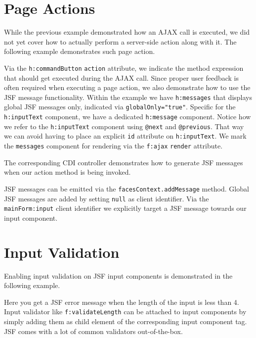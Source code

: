 \section{Page Actions}
While the previous example demonstrated how an AJAX call is executed, we did not yet cover how to actually perform a server-side action along with it.
The following example demonstrates such page action.

Via the \texttt{h:commandButton} \texttt{action} attribute, we indicate the method expression that should get executed during the AJAX call.
Since proper user feedback is often required when executing a page action, we also demonstrate how to use the JSF message functionality.
Within the example we have \texttt{h:messages} that displays global JSF messages only,
indicated via \texttt{globalOnly="true"}.
Specific for the \texttt{h:inputText} component, we have a dedicated \texttt{h:message} component.
Notice how we refer to the \texttt{h:inputText} component using \texttt{@next} and \texttt{@previous}.
That way we can avoid having to place an explicit \texttt{id} attribute on \texttt{h:inputText}.
We mark the \texttt{messages} component for rendering via the \texttt{f:ajax} \texttt{render} attribute.

The corresponding CDI controller demonstrates how to generate JSF messages when our action method is being invoked.

JSF messages can be emitted via the \texttt{facesContext.addMessage} method.
Global JSF messages are added by setting \texttt{null} as client identifier.
Via the \texttt{mainForm:input} client identifier we explicitly target a JSF message towards our input component.

\section{Input Validation}

Enabling input validation on JSF input components is demonstrated in the following example.

Here you get a JSF error message when the length of the input is less than 4.
Input validator like \texttt{f:validateLength} can be attached to input components by simply adding them as child element of the corresponding input component tag.
JSF comes with a lot of common validators out-of-the-box.

